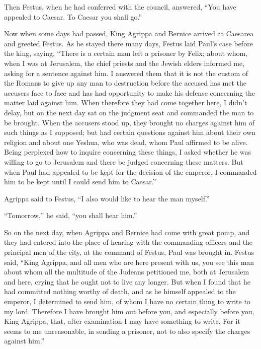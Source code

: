 \myverse{}Then Festus, when he had conferred with the council, answered,
“You have appealed to Caesar. To Caesar you shall go.”

\myverse{}Now when some days had passed, King Agrippa and Bernice arrived
at Caesarea and greeted Festus.
\myverse{}As he stayed there many days, Festus laid Paul’s case before the king, saying,
“There is a certain man left a prisoner by Felix;
\myverse{}about whom, when I was at Jerusalem, the chief priests and the Jewish elders
informed me, asking for a sentence against him.
\myverse{}I answered them that it is not the custom of the Romans to give up any man
to destruction before the accused has met the accusers face to face and has had opportunity to make his
defense concerning the matter laid against him.
\myverse{}When therefore they had come together here, I didn’t delay, but on the next
day sat on the judgment seat and commanded the man to be brought.
\myverse{}When the accusers stood up, they brought no charges against him of such things
as I supposed;
\myverse{}but had certain questions against him about their own religion and about
one Yeshua, who was dead, whom Paul affirmed to be alive.
\myverse{}Being perplexed how to inquire concerning these things, I asked whether he
was willing to go to Jerusalem and there be judged concerning these matters.
\myverse{}But when Paul had appealed to be kept for the decision of the emperor, I
commanded him to be kept until I could send him to Caesar.”

\myverse{}Agrippa said to Festus, “I also would like to hear the man myself.”

“Tomorrow,” he said, “you shall hear him.”

\myverse{}So on the next day, when Agrippa and Bernice had come with great
pomp, and they had entered into the place of hearing with the commanding officers and the principal men
of the city, at the command of Festus, Paul was brought in.
\myverse{}Festus said, “King Agrippa, and all men who are here present with us, you
see this man about whom all the multitude of the Judeans petitioned me, both at Jerusalem and here, crying
that he ought not to live any longer.
\myverse{}But when I found that he had committed nothing worthy of death, and as he
himself appealed to the emperor, I determined to send him,
\myverse{}of whom I have no certain thing to write to my lord. Therefore I have brought
him out before you, and especially before you, King Agrippa, that, after examination I may have something
to write.
\myverse{}For it seems to me unreasonable, in sending a prisoner, not to also specify
the charges against him.”


